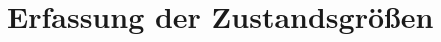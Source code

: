 \ifx\FORMAT\undefined


\fi

\chapter{Erfassung der Zustandsgrößen}
\newpage

\newpage



\ifx\FORMAT\undefined

\fi
